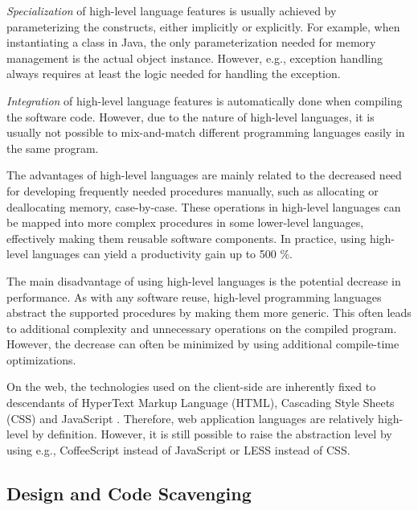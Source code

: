 \emph{Specialization} of high-level language features is usually achieved by parameterizing the constructs, either implicitly or explicitly. For example, when instantiating a class in Java, the only parameterization needed for memory management is the actual object instance. However, e.g., exception handling always requires at least the logic needed for handling the exception. \citep[chap.~3]{krueger_software_1992}

\emph{Integration} of high-level language features is automatically done when compiling the software code. However, due to the nature of high-level languages, it is usually not possible to mix-and-match different programming languages easily in the same program. \citep[chap.~3]{krueger_software_1992}

The advantages of high-level languages are mainly related to the decreased need for developing frequently needed procedures manually, such as allocating or deallocating memory, case-by-case. These operations in high-level languages can be mapped into more complex procedures in some lower-level languages, effectively making them reusable software components. In practice, using high-level languages can yield a productivity gain up to 500 \%. \citep[chap.~3]{krueger_software_1992}

The main disadvantage of using high-level languages is the potential decrease in performance. As with any software reuse, high-level programming languages abstract the supported procedures by making them more generic. This often leads to additional complexity and unnecessary operations on the compiled program. However, the decrease can often be minimized by using additional compile-time optimizations. \citep{carro_high-level_2006}

On the web, the technologies used on the client-side are inherently fixed to descendants of HyperText Markup Language (HTML), Cascading Style Sheets (CSS) and JavaScript \citep{world_wide_web_consortium_html5_2014,world_wide_web_consortium_cascading_2011,ecma_ecmascript_2011}. Therefore, web application languages are relatively high-level by definition. However, it is still possible to raise the abstraction level by using e.g., CoffeeScript \citep{ashkenas_coffeescript_2009} instead of JavaScript or LESS \citep{sellier_less_2009} instead of CSS.

\subsection{Design and Code Scavenging}

